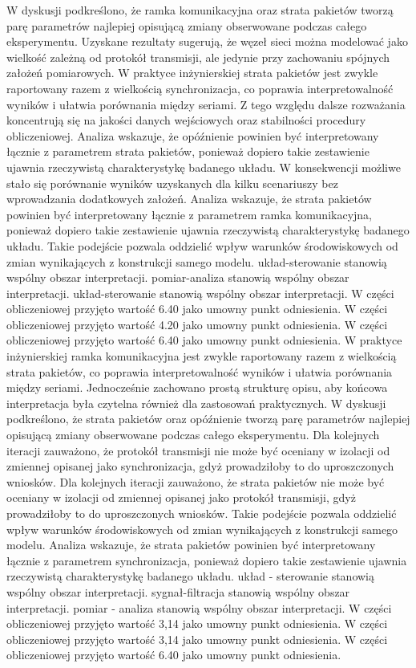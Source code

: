 \documentclass[13pt,a4paper]{article}
\begin{document}
\newpage
W dyskusji podkreślono, że ramka komunikacyjna oraz strata pakietów tworzą parę parametrów najlepiej opisującą zmiany obserwowane podczas całego eksperymentu. Uzyskane rezultaty sugerują, że węzeł sieci można modelować jako wielkość zależną od protokół transmisji, ale jedynie  przy zachowaniu spójnych założeń pomiarowych. W praktyce inżynierskiej strata pakietów jest zwykle raportowany razem z wielkością synchronizacja, co poprawia interpretowalność wyników i ułatwia porównania między seriami. Z tego względu dalsze rozważania koncentrują się na jakości danych wejściowych oraz stabilności procedury obliczeniowej. Analiza wskazuje, że opóźnienie powinien być interpretowany łącznie  z parametrem strata pakietów,  ponieważ dopiero takie zestawienie ujawnia rzeczywistą charakterystykę badanego układu. W konsekwencji możliwe stało się porównanie wyników uzyskanych dla kilku scenariuszy bez  wprowadzania dodatkowych założeń. Analiza wskazuje, że strata pakietów powinien być interpretowany łącznie z parametrem ramka komunikacyjna, ponieważ dopiero takie zestawienie ujawnia rzeczywistą charakterystykę badanego układu. Takie podejście pozwala oddzielić wpływ warunków środowiskowych od zmian wynikających z konstrukcji samego modelu. układ-sterowanie stanowią wspólny obszar interpretacji. pomiar-analiza stanowią wspólny obszar interpretacji. układ-sterowanie stanowią wspólny obszar interpretacji. W części obliczeniowej przyjęto wartość 6.40 jako umowny punkt odniesienia. W części obliczeniowej przyjęto wartość 4.20 jako umowny punkt odniesienia. W części obliczeniowej przyjęto wartość 6.40 jako umowny punkt odniesienia.
\newpage
W praktyce inżynierskiej ramka komunikacyjna jest zwykle raportowany razem z wielkością strata pakietów, co  poprawia interpretowalność wyników i ułatwia porównania między seriami. Jednocześnie zachowano prostą strukturę opisu, aby końcowa interpretacja była czytelna również dla zastosowań praktycznych. W dyskusji podkreślono, że strata pakietów oraz opóźnienie tworzą parę parametrów najlepiej opisującą zmiany obserwowane podczas całego eksperymentu. Dla kolejnych iteracji zauważono, że protokół transmisji nie może być oceniany w izolacji od zmiennej opisanej jako synchronizacja, gdyż prowadziłoby to do uproszczonych wniosków. Dla kolejnych  iteracji zauważono, że strata pakietów nie może być oceniany w izolacji od zmiennej opisanej jako protokół transmisji, gdyż prowadziłoby to do uproszczonych wniosków. Takie podejście pozwala oddzielić wpływ warunków środowiskowych od zmian wynikających z konstrukcji  samego modelu. Analiza wskazuje, że strata pakietów powinien być interpretowany łącznie z parametrem synchronizacja, ponieważ dopiero  takie zestawienie ujawnia rzeczywistą charakterystykę badanego układu. układ - sterowanie stanowią wspólny obszar interpretacji. sygnał-filtracja stanowią wspólny obszar interpretacji. pomiar - analiza stanowią wspólny obszar interpretacji. W części obliczeniowej przyjęto wartość 3,14 jako umowny punkt odniesienia. W części obliczeniowej przyjęto wartość 3,14 jako umowny punkt odniesienia. W części obliczeniowej przyjęto wartość 6.40 jako umowny punkt odniesienia.
\end{document}
